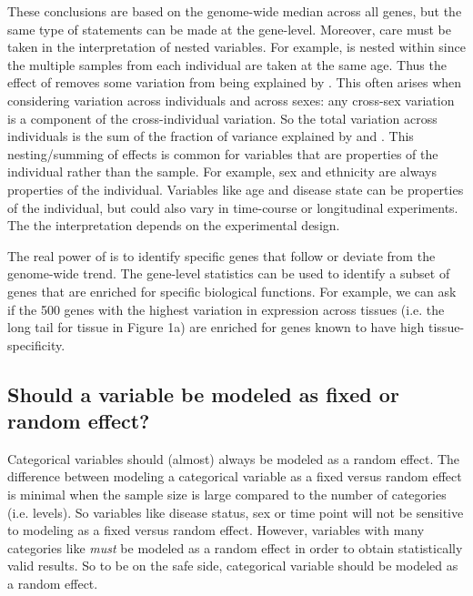 \documentclass[12pt]{article}\usepackage[]{graphicx}\usepackage[]{xcolor}
\begin{document}
These conclusions are based on the genome-wide median across all genes, but the same type of statements can be made at the gene-level.  Moreover, care must be taken in the interpretation of nested variables.  For example,  is nested within  since the multiple samples from each individual are taken at the same age.  Thus the effect of  removes some variation from being explained by .  This often arises when considering variation across individuals and across sexes: any cross-sex variation is a component of the cross-individual variation.  So the total variation across individuals is the sum of the fraction of variance explained by  and .  This nesting/summing of effects is common for variables that are properties of the individual rather than the sample.  For example, sex and ethnicity are always properties of the individual.  Variables like age and disease state can be properties of the individual, but could also vary in time-course or longitudinal  experiments.  The the interpretation depends on the experimental design.

The real power of  is to identify specific genes that follow or deviate from the genome-wide trend.  The gene-level statistics can be used to identify a subset of genes that are enriched for specific biological functions.  For example, we can ask if the 500 genes with the highest variation in expression across tissues (i.e. the long tail for tissue in Figure 1a) are enriched for genes known to have high tissue-specificity.





\subsection{Should a variable be modeled as fixed or random effect?}
 
Categorical variables should (almost) always be modeled as a random effect.  The difference between modeling a categorical variable as a fixed versus random effect is minimal when the sample size is large compared to the number of categories (i.e. levels).  So variables like disease status, sex or time point will not be sensitive to modeling as a fixed versus random effect.  However, variables with many categories like  {\it must} be modeled as a random effect in order to obtain statistically valid results.  So to be on the safe side, categorical variable should be modeled as a random effect.  
\end{document}
